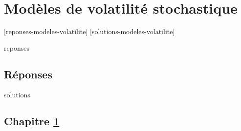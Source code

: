 \chapter{Modèles de volatilité stochastique}
\label{chap:modeles-volatilite}

[reponses-modeles-volatilite]
[solutions-modeles-volatilite]

\begin{Filesave}{reponses}
\bigskip
\section*{Réponses}

\end{Filesave}

\begin{Filesave}{solutions}
\section*{Chapitre \ref{chap:modeles-volatilite}}

\end{Filesave}



